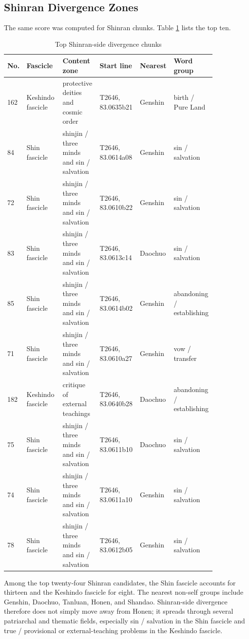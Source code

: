 \documentclass[uplatex,dvipdfmx,11pt,a4paper]{jsarticle}
\begin{document}
\subsection{Shinran Divergence Zones}

The same score was computed for Shinran chunks. Table \ref{tab:shinran-protrusion} lists the top ten.

\begin{table}[H]
\centering
\footnotesize
\setlength{\tabcolsep}{2pt}
\caption{Top Shinran-side divergence chunks}
\label{tab:shinran-protrusion}
\begin{tabular}{@{}p{0.06\linewidth}p{0.17\linewidth}p{0.17\linewidth}p{0.14\linewidth}p{0.13\linewidth}p{0.18\linewidth}@{}}
\toprule
No. & Fascicle & Content zone & Start line & Nearest & Word group \\
\midrule
162 & Keshindo fascicle & protective deities and cosmic order & T2646, 83.0635b21 & Genshin & birth / Pure Land \\
84 & Shin fascicle & shinjin / three minds and sin / salvation & T2646, 83.0614a08 & Genshin & sin / salvation \\
72 & Shin fascicle & shinjin / three minds and sin / salvation & T2646, 83.0610b22 & Genshin & sin / salvation \\
83 & Shin fascicle & shinjin / three minds and sin / salvation & T2646, 83.0613c14 & Daochuo & sin / salvation \\
85 & Shin fascicle & shinjin / three minds and sin / salvation & T2646, 83.0614b02 & Genshin & abandoning / establishing \\
71 & Shin fascicle & shinjin / three minds and sin / salvation & T2646, 83.0610a27 & Genshin & vow / transfer \\
182 & Keshindo fascicle & critique of external teachings & T2646, 83.0640b28 & Daochuo & abandoning / establishing \\
75 & Shin fascicle & shinjin / three minds and sin / salvation & T2646, 83.0611b10 & Daochuo & sin / salvation \\
74 & Shin fascicle & shinjin / three minds and sin / salvation & T2646, 83.0611a10 & Genshin & sin / salvation \\
78 & Shin fascicle & shinjin / three minds and sin / salvation & T2646, 83.0612b05 & Genshin & sin / salvation \\
\bottomrule
\end{tabular}
\end{table}

Among the top twenty-four Shinran candidates, the Shin fascicle accounts for thirteen and the Keshindo fascicle for eight. The nearest non-self groups include Genshin, Daochuo, Tanluan, Honen, and Shandao. Shinran-side divergence therefore does not simply move away from Honen; it spreads through several patriarchal and thematic fields, especially sin / salvation in the Shin fascicle and true / provisional or external-teaching problems in the Keshindo fascicle.
\end{document}
